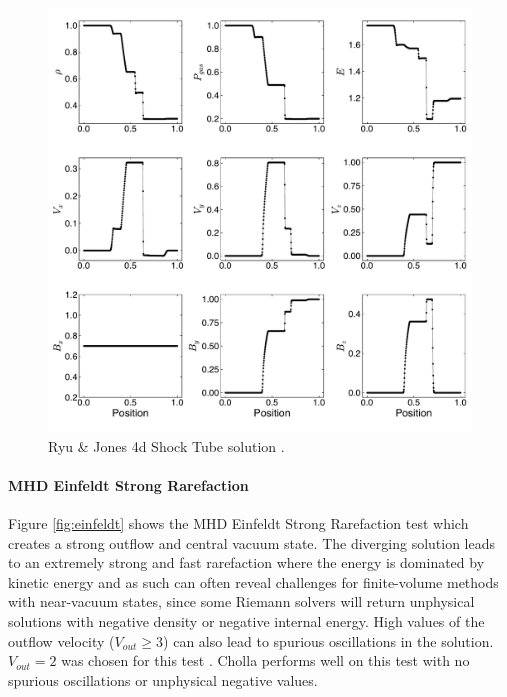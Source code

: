 \documentclass[modern]{aastex631}
\newcommand*{\img}[1]{%
    \raisebox{-.05\baselineskip}{%
        \texttt{[image: \#1]}%
    }%
}
\begin{document}
\begin{figure}[ht!]
    \includegraphics[width=\linewidth]{rj4d.pdf}
    \caption{Ryu \& Jones 4d Shock Tube solution \citep{ryu_jones_1995}.
    \href{https://zenodo.org/records/10927223}{\img{zenodo-gradient-200.png}}}
    \label{fig:rj-4d}
\end{figure}

\paragraph{MHD Einfeldt Strong Rarefaction}
Figure \ref{fig:einfeldt} shows the MHD Einfeldt Strong Rarefaction test \citep{einfeldt_1991} which creates a strong outflow and central vacuum state. The diverging solution leads to an extremely strong and fast rarefaction where the energy is dominated by kinetic energy and as such can often reveal challenges for finite-volume methods with near-vacuum states, since some Riemann solvers will return unphysical solutions with negative density or negative internal energy. High values of the outflow velocity ($V_{out}\ge3$) can also lead to spurious oscillations in the solution. $V_{out} = 2$ was chosen for this test \citep{charm_2011}. Cholla performs well on this test with no spurious oscillations or unphysical negative values.
\end{document}
